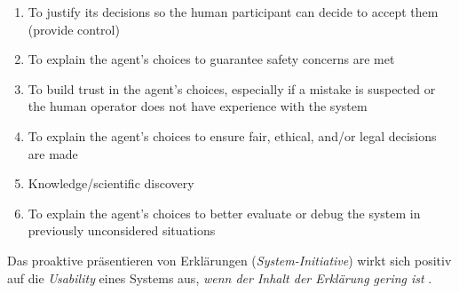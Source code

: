 \begin{enumerate}
    \item To justify its decisions so the human participant can decide to accept them (provide control)
    \item To explain the agent’s choices to guarantee safety concerns are met
    \item To build trust in the agent’s choices, especially if a mistake is suspected or the human operator does not have experience with the system
    \item To explain the agent’s choices to ensure fair, ethical, and/or legal decisions are made
    \item Knowledge/scientific discovery
    \item To explain the agent’s choices to better evaluate or debug the system in previously unconsidered situations
\end{enumerate}

Das proaktive präsentieren von Erklärungen (\textit{System-Initiative}) wirkt sich positiv auf die \textit{Usability} eines Systems aus, \textit{wenn der Inhalt der Erklärung gering ist} \cite{wiegand2019drive}.